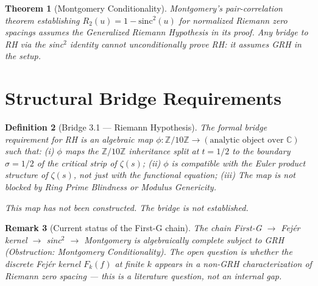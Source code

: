 \documentclass{amsart}
\newtheorem{theorem}{Theorem}
\newtheorem{definition}[theorem]{Definition}
\newtheorem{remark}[theorem]{Remark}
\begin{document}
\begin{theorem}[Montgomery Conditionality]
Montgomery's pair-correlation theorem establishing
$R_2(u) = 1 - \mathrm{sinc}^2(u)$ for normalized Riemann zero spacings
assumes the Generalized Riemann Hypothesis in its proof.
Any bridge to RH via the sinc$^2$ identity cannot unconditionally prove RH:
it assumes GRH in the setup.
\end{theorem}

\section{Structural Bridge Requirements}

\begin{definition}[Bridge 3.1 — Riemann Hypothesis]
The formal bridge requirement for RH is an algebraic map
$\phi: \mathbb{Z}/10\mathbb{Z} \to (\text{analytic object over } \mathbb{C})$ such that:
(i) $\phi$ maps the $\mathbb{Z}/10\mathbb{Z}$ inheritance split at $t=1/2$
    to the boundary $\sigma=1/2$ of the critical strip of $\zeta(s)$;
(ii) $\phi$ is compatible with the Euler product structure of $\zeta(s)$,
    not just with the functional equation;
(iii) The map is not blocked by Ring Prime Blindness or Modulus Genericity.

This map has not been constructed. The bridge is not established.
\end{definition}

\begin{remark}[Current status of the First-G chain]
The chain First-G $\to$ Fej\'er kernel $\to$ sinc$^2$ $\to$ Montgomery
is algebraically complete subject to GRH (Obstruction: Montgomery Conditionality).
The open question is whether the discrete Fej\'er kernel $F_k(f)$ at finite $k$
appears in a non-GRH characterization of Riemann zero spacing — this is a
literature question, not an internal gap.
\end{remark}
\end{document}
